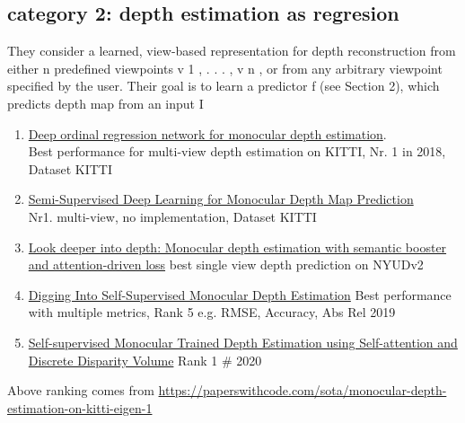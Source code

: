 \subsection{category 2: depth estimation as regresion}
\label{stereo matching networks}
They consider a learned, view-based representation for depth reconstruction from
either n predefined viewpoints {v 1 , . . . , v n }, or from any arbitrary viewpoint specified by the user. Their goal is to learn a predictor f (see Section 2), which predicts depth map from an input I

\begin{enumerate}
    \item \href{https://arxiv.org/abs/1806.02446}{Deep ordinal regression network for monocular depth estimation}. \\
    Best performance for multi-view depth estimation on KITTI, Nr. 1 in 2018, Dataset KITTI \\ 
    \item \href{https://arxiv.org/abs/1702.02706}{Semi-Supervised Deep Learning for Monocular Depth Map Prediction}\\
    Nr1. multi-view, no implementation, Dataset KITTI
    
    \item \href{https://openaccess.thecvf.com/content_ECCV_2018/papers/Jianbo_Jiao_Look_Deeper_into_ECCV_2018_paper.pdf}{Look deeper into depth: Monocular depth estimation with semantic booster and attention-driven loss} best single view depth prediction on NYUDv2
    
    \item \href{https://github.com/nianticlabs/monodepth2
}{Digging Into Self-Supervised Monocular Depth Estimation} Best performance with multiple metrics, Rank 5 e.g. RMSE, Accuracy, Abs Rel 2019

    \item \href{https://paperswithcode.com/paper/self-supervised-monocular-trained-depth}{Self-supervised Monocular Trained Depth Estimation using Self-attention and Discrete Disparity Volume}
    Rank 1 # 2020
\end{enumerate}
Above ranking comes from \href{Rankings}{https://paperswithcode.com/sota/monocular-depth-estimation-on-kitti-eigen-1}






